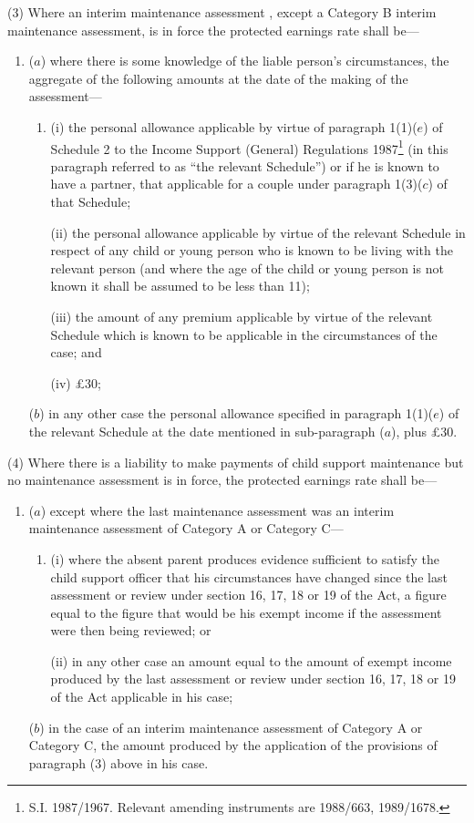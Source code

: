 \documentclass[a4paper]{article}
\begin{document}
(3) Where an interim maintenance assessment%
, except a Category B interim maintenance assessment,  %
is in force the protected earnings rate shall be—
\begin{enumerate}\item[]
($a$) where there is some knowledge of the liable person’s circumstances, the aggregate of the following amounts at the date of the making of the assessment—
\begin{enumerate}\item[]
(i) the personal allowance applicable by virtue of paragraph 1(1)($e$) of Schedule 2 to the Income Support (General) Regulations 1987\footnote{\frenchspacing S.I. 1987/1967. Relevant amending instruments are 1988/663, 1989/1678.} (in this paragraph referred to as “the relevant Schedule”) or if he is known to have a partner, that applicable for a couple under paragraph 1(3)($c$) of that Schedule;

(ii) the personal allowance applicable by virtue of the relevant Schedule in respect of any child or young person who is known to be living with the relevant person (and where the age of the child or young person is not known it shall be assumed to be less than 11);

(iii) the amount of any premium applicable by virtue of the relevant Schedule which is known to be applicable in the circumstances of the case; and

(iv) £30;
\end{enumerate}

($b$) in any other case the personal allowance specified in paragraph 1(1)($e$) of the relevant Schedule at the date mentioned in sub-paragraph ($a$), plus £30.
\end{enumerate}

(4) Where there is a liability to make payments of child support maintenance but no maintenance assessment is in force, the protected earnings rate shall be—
\begin{enumerate}\item[]
($a$) except where the last maintenance assessment was an interim maintenance assessment of Category A or Category C—
\begin{enumerate}\item[]
(i) where the absent parent produces evidence sufficient to satisfy the child support officer that his circumstances have changed since the last assessment or review under section 16, 17, 18 or 19 of the Act, a figure equal to the figure that would be his exempt income if the assessment were then being reviewed; or

(ii) in any other case an amount equal to the amount of exempt income produced by the last assessment or review under section 16, 17, 18 or 19 of the Act applicable in his case;
\end{enumerate}

($b$) in the case of an interim maintenance assessment of Category A or Category C, the amount produced by the application of the provisions of paragraph (3) above in his case.
\end{enumerate}
\end{document}
